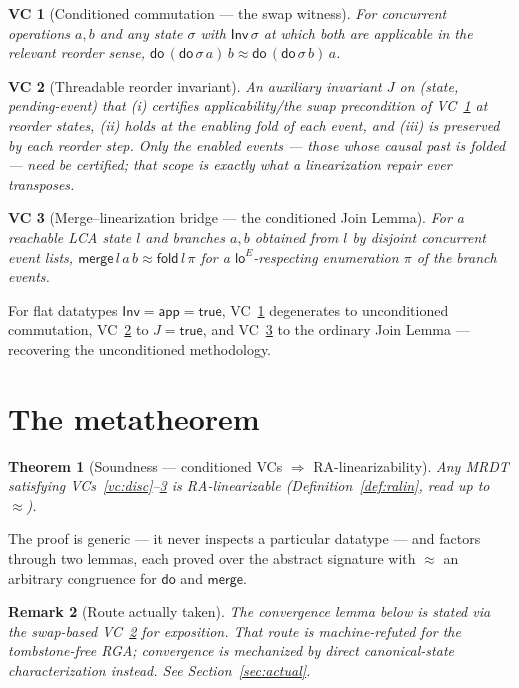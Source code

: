 \documentclass[11pt]{article}
\newtheorem{theorem}{Theorem}[section]
\newtheorem{remark}[theorem]{Remark}
\newtheorem{vc}{VC}
\newcommand{\loE}[1]{\mathsf{lo}^{#1}}
\newcommand{\st}{\sigma}
\newcommand{\dodo}{\mathsf{do}}
\newcommand{\merge}{\mathsf{merge}}
\newcommand{\eqobs}{\approx}
\newcommand{\fold}{\mathsf{fold}}
\newcommand{\Inv}{\mathsf{Inv}}
\newcommand{\app}{\mathsf{app}}
\begin{document}
\begin{vc}[Conditioned commutation --- the swap witness]\label{vc:comm}
For concurrent operations $a,b$ and any state $\st$ with $\Inv\,\st$ at which both are
applicable in the relevant reorder sense, $\dodo\,(\dodo\,\st\,a)\,b \eqobs
\dodo\,(\dodo\,\st\,b)\,a$.
\end{vc}

\begin{vc}[Threadable reorder invariant]\label{vc:inv}
An auxiliary invariant $J$ on (state, pending-event) that (i) certifies applicability/the
swap precondition of VC~\ref{vc:comm} at reorder states, (ii) holds at the enabling fold of
each event, and (iii) is preserved by each reorder step. Only the \emph{enabled} events ---
those whose causal past is folded --- need be certified; that scope is exactly what a
linearization repair ever transposes.
\end{vc}

\begin{vc}[Merge--linearization bridge --- the conditioned Join Lemma]\label{vc:merge}
For a reachable LCA state $l$ and branches $a,b$ obtained from $l$ by disjoint concurrent
event lists, $\merge\,l\,a\,b \eqobs \fold\,l\,\pi$ for a $\loE{E}$-respecting enumeration $\pi$
of the branch events.
\end{vc}

For flat datatypes $\Inv = \app = \mathsf{true}$, VC~\ref{vc:comm} degenerates to
unconditioned commutation, VC~\ref{vc:inv} to $J = \mathsf{true}$, and VC~\ref{vc:merge} to
the ordinary Join Lemma --- recovering the unconditioned methodology.

\section{The metatheorem}\label{sec:meta}

\begin{theorem}[Soundness --- conditioned VCs $\Rightarrow$ RA-linearizability]\label{thm:meta}
Any MRDT satisfying VCs~\ref{vc:disc}--\ref{vc:merge} is RA-linearizable
(Definition~\ref{def:ralin}, read up to $\eqobs$).
\end{theorem}

The proof is generic --- it never inspects a particular datatype --- and factors through two
lemmas, each proved over the abstract signature with $\eqobs$ an arbitrary congruence for
$\dodo$ and $\merge$.

\begin{remark}[Route actually taken]
The convergence lemma below is stated via the swap-based VC~\ref{vc:inv} for exposition. That
route is \emph{machine-refuted} for the tombstone-free RGA; convergence is mechanized by direct
canonical-state characterization instead. See Section~\ref{sec:actual}.
\end{remark}
\end{document}
